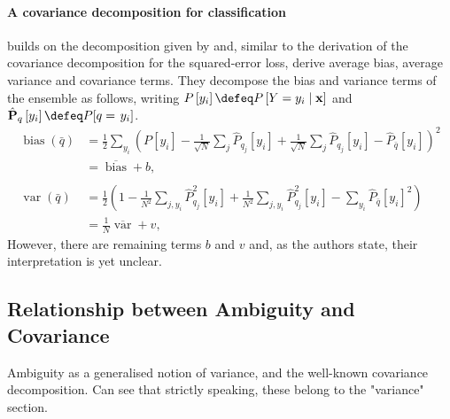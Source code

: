 \documentclass[../main.tex]{subfiles}
\begin{document}
\paragraph{A covariance decomposition for classification}
\citeauthor{didaci_DiversityClassifierEnsembles_2013} builds on the decomposition given by \citeauthor{kohavi_BiasVarianceDecomposition_} and, similar to the derivation of the covariance decomposition for the squared-error loss, derive average bias, average variance and covariance terms.  They decompose the bias and variance terms of the ensemble as follows, writing $P\left[y_i\right]\defeq P\left[Y=y_i \mid \mathbf{x}\right]$ and $\hat{P}_{q}\left[y_i\right] \defeq P[q=\left.y_i\right]$. 
\begin{align*}
\operatorname{bias}(\bar{q}) & =\frac{1}{2} \sum_{y_i}\left(P\left[y_i\right]-\frac{1}{\sqrt{N}} \sum_j \hat{P}_{q_{j}}\left[y_i\right]+\frac{1}{\sqrt{N}} \sum_j \hat{P}_{q_{j}}\left[y_i\right]-\hat{P}_{\bar{q}}\left[y_i\right]\right)^2 \\
& =\overline{\operatorname{bias}}+b, \\ \\
\operatorname{var}(\bar{q}) & =\frac{1}{2}\left(1-\frac{1}{N^2} \sum_{j, y_i} \hat{P}_{q_{j}}^2\left[y_i\right]+\frac{1}{N^2} \sum_{j, y_i} \hat{P}_{q_{j}}^2\left[y_i\right]-\sum_{y_i} \hat{P}_{\bar{q}}\left[y_i\right]^2\right) \\
& =\frac{1}{N} \overline{\operatorname{var}}+v,
\end{align*}
However, there are remaining terms $b$ and $v$ and, as the authors state, their interpretation is yet unclear.


\subsection{Relationship between Ambiguity and Covariance}

Ambiguity as a generalised notion of variance, and the well-known covariance decomposition.  Can see that strictly speaking, these belong to the "variance" section.
\end{document}
